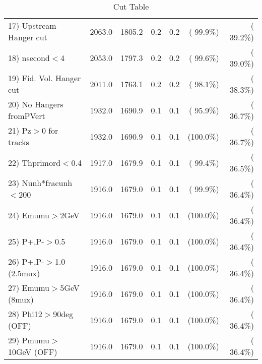 \begin{table}[h!]
\begin{tabular}{||l||r|r|r|r|r|r||}
 17) Upstream Hanger cut  &       2063.0 &       1805.2 &          0.2 &          0.2 & ( 99.9\%) & ( 39.2\%) \\
 18) nsecond$<$4          &       2053.0 &       1797.3 &          0.2 &          0.2 & ( 99.6\%) & ( 39.0\%) \\
 19) Fid. Vol. Hanger cut &       2011.0 &       1763.1 &          0.2 &          0.2 & ( 98.1\%) & ( 38.3\%) \\
 20) No Hangers fromPVert &       1932.0 &       1690.9 &          0.1 &          0.1 & ( 95.9\%) & ( 36.7\%) \\
 21) Pz$>$0 for tracks    &       1932.0 &       1690.9 &          0.1 &          0.1 & (100.0\%) & ( 36.7\%) \\
 22) Thprimord$<$0.4      &       1917.0 &       1679.9 &          0.1 &          0.1 & ( 99.4\%) & ( 36.5\%) \\
 23) Nunh*fracunh$<$200   &       1916.0 &       1679.0 &          0.1 &          0.1 & ( 99.9\%) & ( 36.4\%) \\
 24) Emumu$>$2GeV         &       1916.0 &       1679.0 &          0.1 &          0.1 & (100.0\%) & ( 36.4\%) \\
 25) P+,P-$>$0.5          &       1916.0 &       1679.0 &          0.1 &          0.1 & (100.0\%) & ( 36.4\%) \\
 26) P+,P-$>$1.0 (2.5mux) &       1916.0 &       1679.0 &          0.1 &          0.1 & (100.0\%) & ( 36.4\%) \\
 27) Emumu$>$5GeV  (8mux) &       1916.0 &       1679.0 &          0.1 &          0.1 & (100.0\%) & ( 36.4\%) \\
 28) Phi12$>$90deg  (OFF) &       1916.0 &       1679.0 &          0.1 &          0.1 & (100.0\%) & ( 36.4\%) \\
 29) Pmumu$>$10GeV  (OFF) &       1916.0 &       1679.0 &          0.1 &          0.1 & (100.0\%) & ( 36.4\%) \\
 \hline
 \hline
 \end{tabular}
 \caption{Cut Table           }
 \label{tab-cutcohjpsi-mumu_jpsi}
 \end{table}
